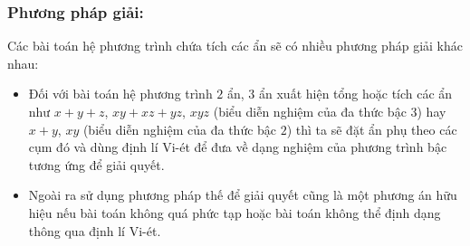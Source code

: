 \documentclass[12pt,a4paper,oneside]{book}
\theoremstyle{theorem}
\theoremstyle{definition}
\begin{document}
\subsubsection{Phương pháp giải:} Các bài toán hệ phương trình chứa tích các ẩn sẽ có nhiều phương pháp giải khác nhau: 
\begin{itemize}
    \item Đối với bài toán hệ phương trình $2$ ẩn, $3$ ẩn xuất hiện tổng hoặc tích các ẩn như $x+y+z$, $xy+xz+yz$, $xyz$ (biểu diễn nghiệm của đa thức bậc $3$) hay $x+y$, $xy$ (biểu diễn nghiệm của đa thức bậc $2$) thì ta sẽ đặt ẩn phụ theo các cụm đó và dùng định lí Vi-ét để đưa về dạng nghiệm của phương trình bậc tương ứng để giải quyết.
    \item Ngoài ra sử dụng phương pháp thế để giải quyết cũng là một phương án hữu hiệu nếu bài toán không quá phức tạp hoặc bài toán không thể định dạng thông qua định lí Vi-ét.
\end{itemize}
\end{document}
